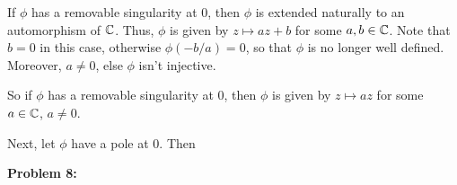 \documentclass[a4paper,12pt]{article}
\begin{document}
If $\phi$ has a removable singularity at $0$, then $\phi$ is extended naturally to an automorphism of $\mathbb{C}$. Thus, $\phi$ is given by $z \mapsto az+b$ for some $a,b \in \mathbb{C}$. Note that $b=0$ in this case, otherwise $\phi(-b/a) = 0$, so that $\phi$ is no longer well defined. Moreover, $a \neq 0$, else $\phi$ isn't injective.

So if $\phi$ has a removable singularity at $0$, then $\phi$ is given by $z \mapsto az$ for some $a \in \mathbb{C}$, $a \neq 0$.

Next, let $\phi$ have a pole at $0$. Then %

\shunt

{\bf Problem 8:}

\shunt
\end{document}
